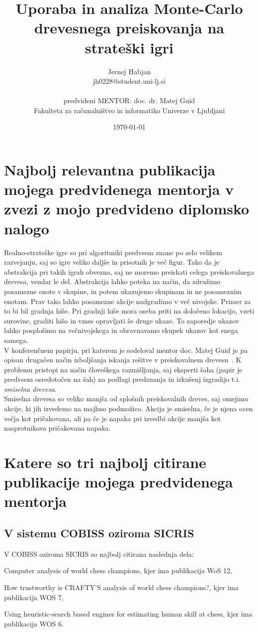 \documentclass[11pt,a4paper]{article}
\title{Uporaba in analiza Monte-Carlo drevesnega preiskovanja na strateški igri}
\author{Jernej Habjan\\
jh0228@student.uni-lj.si\\
\ \\
predvideni MENTOR: doc. dr. Matej Guid \\
Fakulteta za računalništvo in informatiko Univerze v Ljubljani
\date{\today}         
}
\begin{document}
\maketitle

\section{Najbolj relevantna publikacija mojega predvidenega mentorja v zvezi z mojo predvideno diplomsko nalogo}

Realno-strateške igre so pri algoritmiki predvsem znane po zelo velikem razvejanju, saj so igre veliko daljše in prisotnih je več figur.
Tako da je abstrakcija pri takih igrah obvezna, saj ne moremo preiskati celega preiskovalnega drevesa, vendar le del.
Abstrakcija lahko poteka na način, da združimo posamezne enote v skupine, in potem ukazujemo skupinam in ne posameznim enotam.
Prav tako lahko posamezne akcije nadgradimo v več nivojske.
Primer za to bi bil gradnja hiše.
Pri gradnji hiše mora oseba priti na določeno lokacijo, vzeti surovine, graditi hišo in vmes opravljati še druge ukaze.
To zaporedje ukazov lahko posplošimo na večnivojskega in obravnavamo skupek ukazov kot enega samega.\\
V konferenčnem papirju, pri katerem je sodeloval mentor doc. Matej Guid je pa opisan drugačen način izboljšanja iskanja rešitve v preiskovalnem drevesu~\cite{stoiljkovikj2015computational}.
K problemu pristopi na način človeškega razmišljanja, saj eksperti šaha (papir je predvsem osredotočen na šah)  na podlagi predznanja in izkušenj izgradijo t.i. \textit{smiselna drevesa}.\\
Smiselna drevesa so veliko manjša od splošnih preiskovalnih dreves, saj omejimo akcije, ki jih izvedemo na majhno podmožico.
Akcija je smiselna, če je njena ocen večja kot pričakovana, ali pa če je napaka pri izvedbi akcije manjša kot nasprotnikova pričakovana napaka.


\section{Katere so tri najbolj citirane publikacije mojega predvidenega mentorja}

\subsection{V sistemu COBISS oziroma SICRIS}
V COBISS oziroma SICRIS so najbolj citirana naslednja dela:
\begin{description}
\item Computer analysis of world chess champions, kjer ima publikacija WoS 12,
\item How trustworthy is CRAFTY'S analysis of world chess champions?, kjer ima publikacija WOS 7,
\item Using heuristic-search based engines for estimating human skill at chess, kjer ima publikacija WOS 6.

\end{description}
\end{document}
